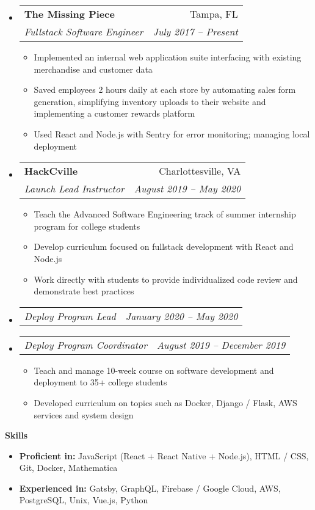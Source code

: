 \documentclass[letterpaper,12pt]{article}[leftmargin=*]
\makeatletter
\def \entryspacing {-0pt}
\renewcommand{\section}[2]{\vspace{5pt}
  \colorbox{secondary}{\color{white}\raggedbottom\normalsize\textbf{{#1}{\hspace{7pt}#2}}}
}
\newcommand{\resumeEntryStart}{\begin{itemize}[leftmargin=2.5mm]}
\newcommand{\resumeEntryEnd}{\end{itemize}\vspace{\entryspacing}}
\newcommand{\resumeItemListStart}{\begin{itemize}[leftmargin=4.5mm]}
\newcommand{\resumeItemListEnd}{\end{itemize}}
\newcommand{\resumeItem}[1]{
  \item\small{
    {#1 \vspace{-2pt}}
  }
}
\newcommand{\resumeEntryTSDL}[4]{
  \vspace{-1pt}\item[]
    \begin{tabular*}{0.97\textwidth}{l@{\extracolsep{\fill}}r}
      \textbf{\color{primary}#1} & {\firabook\color{accent}\small#2} \\
      \textit{\color{accent}\small#3} & \textit{\color{accent}\small#4} \\
    \end{tabular*}\vspace{-7pt}
}
\newcommand{\resumeEntrySD}[2]{
  \vspace{-1pt}\item[]
    \begin{tabular*}{0.97\textwidth}{l@{\extracolsep{\fill}}r}
      \textit{\color{accent}\small#1} & \textit{\color{accent}\small#2} \\
    \end{tabular*}\vspace{-6pt}
}
\newcommand{\resumeEntryS}[2]{
  \item[]\small{
    \textbf{\color{primary}#1} #2\vspace{-6pt}
  }
}
\makeatother
\begin{document}
  \resumeEntryStart
    \resumeEntryTSDL
      {The Missing Piece}{Tampa, FL}
      {Fullstack Software Engineer}{July 2017 -- Present}
    \resumeItemListStart
      \resumeItem {Implemented an internal web application suite interfacing with existing merchandise and customer data}
      \resumeItem {Saved employees 2 hours daily at each store by automating sales form generation, simplifying inventory uploads to their website and implementing a customer rewards platform}
      \resumeItem {Used React and Node.js with Sentry for error monitoring; managing local deployment}
    \resumeItemListEnd
  \resumeEntryEnd

  \resumeEntryStart
    \resumeEntryTSDL
      {HackCville}{Charlottesville, VA}
      {Launch Lead Instructor}{August 2019 -- May 2020}
    \resumeItemListStart
      \resumeItem {Teach the Advanced Software Engineering track of summer internship program for college students}
      \resumeItem{Develop curriculum focused on fullstack development with React and Node.js}
      \resumeItem {Work directly with students to provide individualized code review and demonstrate best practices}
    \resumeItemListEnd
    \resumeEntrySD
      {Deploy Program Lead}{January 2020 -- May 2020}
    \resumeEntrySD
      {Deploy Program Coordinator}{August 2019 -- December 2019}
    \resumeItemListStart
      \resumeItem {Teach and manage 10-week course on software development and deployment to 35+ college students}
      \resumeItem {Developed curriculum on topics such as Docker, Django / Flask, AWS services and system design}
    \resumeItemListEnd
  \resumeEntryEnd

\section{\faGears}{Skills}
 \resumeEntryStart
  \resumeEntryS{Proficient in:} {JavaScript (React + React Native + Node.js), HTML / CSS, Git, Docker, Mathematica}
  \resumeEntryS{Experienced in:} {Gatsby, GraphQL, Firebase / Google Cloud, AWS, PostgreSQL, Unix, Vue.js, Python}
 \resumeEntryEnd
\end{document}
